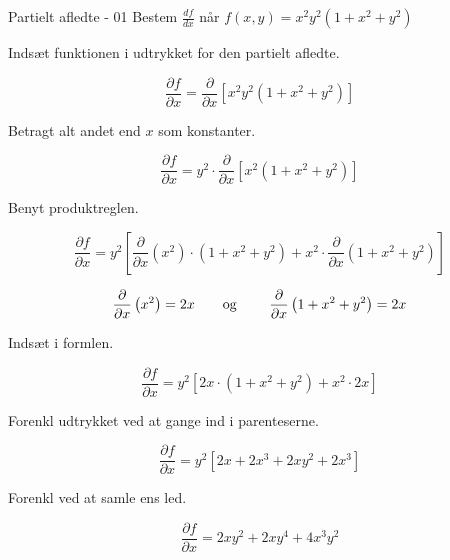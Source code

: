 \documentclass{article}
\begin{document}
\tableofcontents
\newpage

\begin{exercise}{Partielt afledte - 01}
Bestem $\frac{df}{dx}$ når $f(x,y) = x^2y^2\left(1+x^2+y^2\right)$ 


\hint
Indsæt funktionen i udtrykket for den partielt afledte.

\hint

\[
\frac{\partial f}{\partial x} = \frac{\partial }{\partial x} \left[ x^2y^2\left(1+x^2+y^2 \right)\right]
\]

\hint
Betragt alt andet end $x$ som konstanter.

\hint
\[
\frac{\partial f}{\partial x} = y^2 \cdot \frac{\partial }{\partial x} \left[ x^2\left(1+x^2+y^2 \right) \right]
\]

\hint

Benyt produktreglen.

\hint
\[
\frac{\partial f}{\partial x} = y^2\left[\frac{\partial }{\partial x}\left(x^2 \right) \cdot \left( 1+x^2+y^2 \right) + x^2 \cdot \frac{\partial}{\partial x} \left( 1+x^2+y^2\right) \right]
\]

\hint
\[\frac{\partial }{\partial x} \left(x^2\right) = 2x \textrm{\qquad og \qquad} \frac{\partial }{\partial x} \left(1+x^2+y^2\right) = 2x
\]

\hint
Indsæt i formlen.

\hint
\[
\frac{\partial f}{\partial x} = y^2\left[2x \cdot \left( 1+x^2+y^2 \right) + x^2 \cdot 2x \right]
\]

\hint
Forenkl udtrykket ved at gange ind i parenteserne.

\hint
\[
\frac{\partial f}{\partial x} = y^2 \left[ 2x+2x^3+2xy^2 + 2x^3 \right]
\]

\hint 
Forenkl ved at samle ens led.

\hint
\[
\frac{\partial f}{\partial x} = 2xy^2+2xy^4 + 4x^3y^2
\]

\end{exercise}

\newpage
\end{document}
